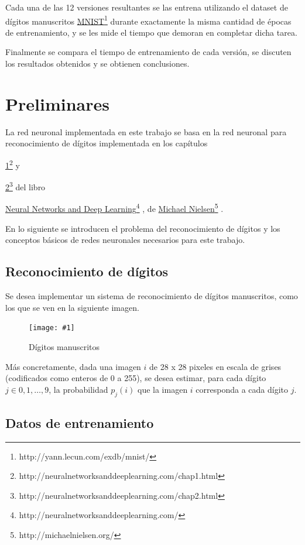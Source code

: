 \documentclass[a4paper, 10pt, twoside]{article}
\newcommand{\img}[3]{
  \begin{figure}[H]
    \begin{center}
      \texttt{[image: \#1]}
    \end{center}
    \caption{#2}
    \label{#3}
  \end{figure}
}
\newcommand{\link}[2]{
  \href{#1}{#2}\footnote{#1}
}
\begin{document}
Cada una de las 12 versiones resultantes se las entrena utilizando el dataset
de dígitos manuscritos \link{http://yann.lecun.com/exdb/mnist/}{MNIST} durante
exactamente la misma cantidad de épocas de entrenamiento, y se les mide el
tiempo que demoran en completar dicha tarea.

Finalmente se compara el tiempo de entrenamiento de cada versión, se discuten
los resultados obtenidos y se obtienen conclusiones.




\section{Preliminares}

La red neuronal implementada en este trabajo se basa en la red neuronal para
reconocimiento de dígitos implementada en los capítulos
\link{http://neuralnetworksanddeeplearning.com/chap1.html}{1} y
\link{http://neuralnetworksanddeeplearning.com/chap2.html}{2} del libro
\link{http://neuralnetworksanddeeplearning.com/}{Neural Networks and Deep
Learning}, de \link{http://michaelnielsen.org/}{Michael Nielsen}.

En lo siguiente se introducen el problema del reconocimiento de dígitos y los
conceptos básicos de redes neuronales necesarios para este trabajo.


\subsection{Reconocimiento de dígitos}

Se desea implementar un sistema de reconocimiento de dígitos manuscritos, como
los que se ven en la siguiente imagen.

\img{digits.png}{Dígitos manuscritos}{img:digits}

Más concretamente, dada una imagen $i$ de 28 x 28 pixeles en escala de grises
(codificados como enteros de 0 a 255), se desea estimar, para cada dígito $j
\in {0, 1, \ldots, 9}$, la probabilidad $p_j(i)$ que la imagen $i$ corresponda
a cada dígito $j$.


\subsection{Datos de entrenamiento}
\end{document}
